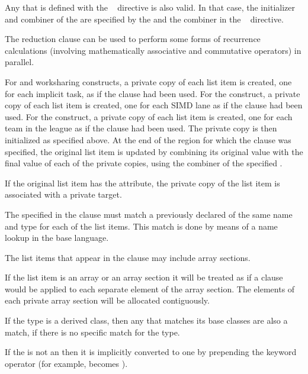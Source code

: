 Any  that is defined with the ~ directive is 
also valid. In that case, the initializer and combiner of the  are 
specified by the  and the combiner in the ~ 
directive.

\descr
The reduction clause can be used to perform some forms of recurrence calculations 
(involving mathematically associative and commutative operators) in parallel.

For  and worksharing constructs, a private copy of each list item is created, 
one for each implicit task, as if the  clause had been used. For the  
construct, a private copy of each list item is created, one for each SIMD lane as if the 
 clause had been used. For the  construct, a private copy of each list 
item is created, one for each team in the league as if the  clause had been 
used. The private copy is then initialized as specified above. At the end of the region for 
which the  clause was specified, the original list item is updated by 
combining its original value with the final value of each of the private copies, using the 
combiner of the specified .

\fortranspecificstart
If the original list item has the  attribute, the
private copy of the list item is associated with a private target.
\fortranspecificend

The  specified in the  clause must match a previously 
declared  of the same name and type for each of the list items. This 
match is done by means of a name lookup in the base language. 

\ccppspecificstart
The list items that appear in the  clause may include array sections.

If the list item is an array or an array section it will be treated as if a  clause would be applied to each separate element of the array section. The elements of each private array section will be allocated contiguously.
\ccppspecificend

\cppspecificstart
If the type is a derived class, then any  that matches its base classes 
are also a match, if there is no specific match for the type.

If the  is not an  then it is implicitly converted to one by 
prepending the keyword operator (for example, \code{+} becomes ).

